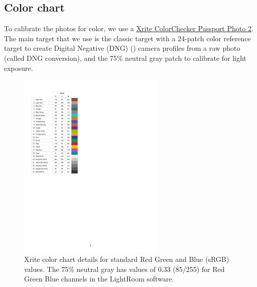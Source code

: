\documentclass[10pt,letter,english]{article}
\begin{document}

\subsection{Color chart}
To calibrate the photos for color, we use a \href{https://www.xrite.com/categories/calibration-profiling/colorchecker-classic-family/colorchecker-passport-photo-2}{Xrite ColorChecker Passport Photo 2}.
The main target that we use is the classic target with a 24-patch color reference target to create Digital Negative (DNG) (\citeauthor{Adobe2012DNG}) camera profiles from a raw photo (called DNG conversion), and the 75\% neutral gray patch to calibrate for light exposure.


\begin{figure}[H]
    \centering
    \includegraphics[width=7cm]{Figures/Color chart sRGB values.pdf}
    \caption{Xrite color chart details for standard Red Green and Blue (sRGB) values. The 75\% neutral gray has values of 0.33 (85/255) for Red Green Blue channels in the LightRoom software.}
    \label{fig:xrite_description}
\end{figure}
\end{document}
